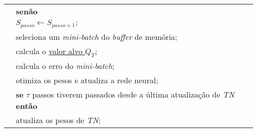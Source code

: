 \begin{tabular}{l l}
 & \qquad \qquad \textbf{senão}\\
 & \qquad \qquad \qquad $S_{passo} \leftarrow S_{passo+1};$ \\

 & \qquad \qquad seleciona um \textit{mini-batch} do \textit{buffer} de memória;\\
 & \qquad \qquad calcula o \hyperref[eq:q_target]{valor alvo $Q_{T}$};\\
 & \qquad \qquad calcula o erro do \textit{mini-batch};\\
 & \qquad \qquad otimiza os pesos e atualiza a rede neural;\\
 & \qquad \qquad \textbf{se} $\tau$ passos tiverem passados desde a última atualização de \textit{TN} \textbf{então}\\
 & \qquad \qquad \qquad atualiza os pesos de \textit{TN};\\

\hline
\end{tabular}

